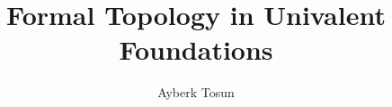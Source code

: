 

\usepackage{ebproof}
\usepackage{wasysym}

\title{Formal Topology in Univalent Foundations}
\author{Ayberk Tosun}





\newcommand{\reals}{\mathbb{R}}
\newcommand{\nats}{\mathbb{N}}
\newcommand{\bool}{\mathbf{Bool}}
\newcommand{\ball}[2]{\mathfrak{A}(#1, #2)}
\newcommand{\neighbourhood}[1]{\mathbf{N}(#1)}

\newcommand{\oftyI}[2]{#1\hspace{0.1mm}:\hspace{0.1mm}#2}
\newcommand{\oftyII}[3]{#1~#2:#3}
\newcommand{\refl}{\mathsf{refl}}
\newcommand{\zero}{\mathsf{zero}}
\newcommand{\suc}[1]{\mathsf{suc}\left(#1\right)}

\newcommand{\iscontr}[1]{\mathsf{isContr}\left(#1\right)}
\newcommand{\isprop}[1]{\mathsf{isProp}\left(#1\right)}
\newcommand{\isset}[1]{\mathsf{isSet}\left(#1\right)}
\newcommand{\isofhlevel}[2]{\mathsf{isOfHLevel}\left(#1, #2\right)}

\newcommand{\pity}[3]{\prod_{(#1~:~#2)} #3}
\newcommand{\sigmaty}[3]{\sum_{(#1~:~#2)} #3}
\newcommand{\univ}{\mathcal{U}}
\newcommand{\isaprop}[1]{\mathsf{IsProp}\left(#1\right)}
\newcommand{\hprop}{\mathsf{hProp}}
\newcommand{\isaset}[1]{\mathsf{IsSet}\left(#1\right)}
\newcommand{\abs}[1]{\left| #1 \right|}
\newcommand{\trunc}[1]{\left\| #1 \right\|}
\newcommand{\pow}[1]{\mathcal{P}\left(#1\right)}
\newcommand{\sub}[2]{\mathsf{Fam}_{#1}\left(#2\right)}
\newcommand{\indexnm}{\mathsf{index}}
\newcommand{\indexset}[1]{\indexnm{}\left(#1\right)}
\newcommand{\pair}[2]{\langle #1 , #2 \rangle}

\newcommand{\isdcnm}{\mathsf{DownwardsClosed}}
\newcommand{\isdc}[1]{\isdcnm{}\left(#1\right)}
\newcommand{\dcsubsetnm}{\mathsf{DCSubset}}
\newcommand{\dcsubset}[1]{\dcsubsetnm{}\left(#1\right)}

\newcommand{\ordernm}{\mathsf{Order}}
\newcommand{\order}[2]{\ordernm{}_{#1}\left(#2\right)}

\newcommand{\posetstrnm}{\mathsf{PosetStr}}
\newcommand{\posetstr}[2]{\posetstrnm{}_{#1}\left(#2\right)}


